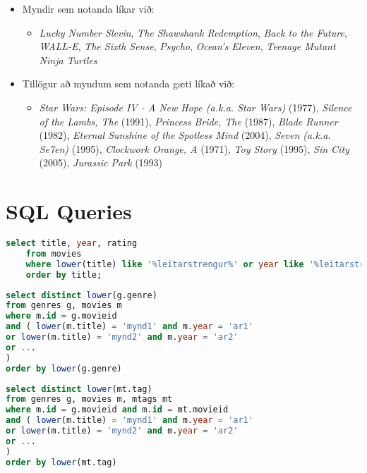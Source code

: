 \documentclass[12pt, git, final]{rureport}
\begin{document}
\begin{itemize}
	\pagebreak
	\item Myndir sem notanda líkar við: 
	\begin{itemize}
		\item \textit{Lucky Number Slevin}, \textit{The Shawshank Redemption}, \textit{Back to the Future}, \textit{WALL-E}, \textit{The Sixth Sense}, \textit{Psycho}, \textit{Ocean's Eleven}, \textit{Teenage Mutant Ninja Turtles}
	\end{itemize}
	\item Tillögur að myndum sem notanda gæti líkað við:
	\begin{itemize}
		\item \textit{Star Wars: Episode IV - A New Hope (a.k.a. Star Wars)}  (1977), \textit{Silence of the Lambs, The}  (1991), \textit{Princess Bride, The}  (1987), \textit{Blade Runner}  (1982), \textit{Eternal Sunshine of the Spotless Mind}  (2004), \textit{Seven (a.k.a. Se7en)}  (1995), \textit{Clockwork Orange, A}  (1971), \textit{Toy Story}  (1995), \textit{Sin City}  (2005), \textit{Jurassic Park}  (1993)
	\end{itemize}
\end{itemize}

\pagebreak
\appendix
\section{SQL Queries} \label{app:sql}
\begin{lstlisting}[language = SQL, caption = Finna myndir sem notanda líkar út frá leitarstreng, label=lst:Search]
	select title, year, rating
	from movies
	where lower(title) like '%leitarstrengur%' or year like '%leitarstrengur%'
	order by title;
\end{lstlisting}

\begin{lstlisting}[language = SQL, caption = Finna genres út frá titlum og ári titla, label = lst:genre]
select distinct lower(g.genre)
from genres g, movies m
where m.id = g.movieid
and ( lower(m.title) = 'mynd1' and m.year = 'ar1'
or lower(m.title) = 'mynd2' and m.year = 'ar2'
or ...
)
order by lower(g.genre)
\end{lstlisting}

\begin{lstlisting}[language = SQL, caption = Finna tags út frá titlum og ári titla, label = lst:tag]
select distinct lower(mt.tag)
from genres g, movies m, mtags mt
where m.id = g.movieid and m.id = mt.movieid
and ( lower(m.title) = 'mynd1' and m.year = 'ar1'
or lower(m.title) = 'mynd2' and m.year = 'ar2'
or ...
)
order by lower(mt.tag)
\end{lstlisting}
\end{document}
